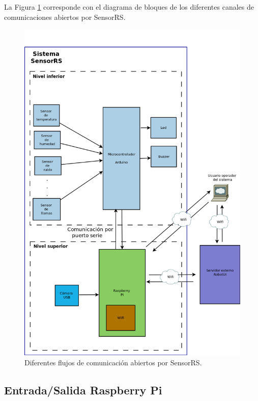 La Figura \ref{figura:diagrama-comunicacion-robot} corresponde con el diagrama de bloques de los diferentes canales de comunicaciones abiertos por SensorRS.\\

\begin{figure}[H]
  \begin{center}
    \includegraphics[scale=0.4]{diagramas/diagrama_bloques_general.png}
  \end{center}
  \caption{Diferentes flujos de comunicación abiertos por SensorRS.}
  \label{figura:diagrama-comunicacion-robot}
\end{figure}

\subsection{Entrada/Salida Raspberry Pi}


